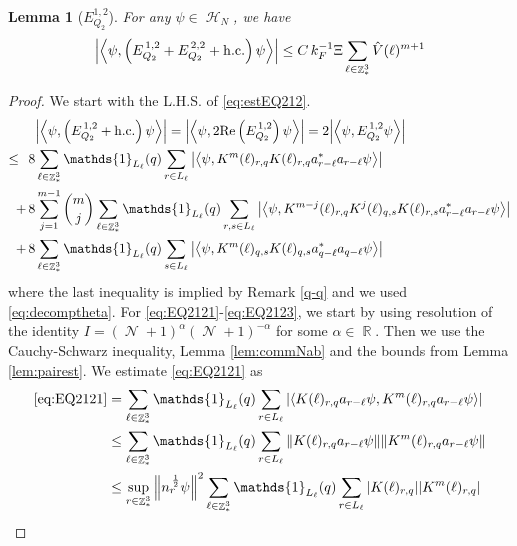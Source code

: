 \documentclass[sn-mathphys, Numbered ,a4paper]{sn-jnl}%
\DeclareMathOperator{\R}{\mathbb{R}}
\DeclareMathOperator{\Z}{\mathbb{Z}}
\DeclareMathOperator{\HH}{\mathcal{H}}
\DeclareMathOperator{\NN}{\mathcal{N}}
\newcommand{\half}{\frac{1}{2}}
\newcommand{\eva}[1]{\left\langle #1 \right\rangle}
\theoremstyle{plain}
\newtheorem{lemma}[theorem]{Lemma}
\theoremstyle{definition}
\theoremstyle{remark}
\theoremstyle{plain}
\theoremstyle{definition}
\theoremstyle{remark}
\begin{document}
\begin{lemma}[$E_{Q_2}^{1,2}$]\label{lem:EQ212}
    For any $\psi \in \HH_N$, we have
    \begin{alignat}{2}
    \abs{\eva{\psi,\left(E^{\,1,2}_{Q_2}+E^{\,2,2}_{Q_2}+\mathrm{h.c.}\right) \psi }}
   	\leq   C\, k_{F}^{-1} \Xi \sum\limits_{\ell \in \Z^3_*} \hat{V}(\ell)^{m+1} \label{eq:estEQ212}
    \end{alignat}
\end{lemma}
\begin{proof}
     We start with the L.H.S. of \eqref{eq:estEQ212}.
    \begin{align}
    	&\abs{\eva{\psi,\left(E^{\,1,2}_{Q_2}+\mathrm{h.c.}\right) \psi }} = \abs{\eva{\psi,2\mathrm{Re}\left(E^{\,1,2}_{Q_2}\right) \psi }} = 2\abs{\eva{\psi, E^{\,1,2}_{Q_2} \psi }}\nonumber\\
    	\leq\,\;8& \sum\limits_{\ell\in \Z^3_*} \mathds{1}_{L_{\ell}}(q) \sum\limits_{r\in L_{\ell}} \abs{\eva{\psi, K^m(\ell)_{r,q} K(\ell)_{r,q} a^*_{r-\ell} a_{r-\ell} \psi }}\label{eq:EQ2121}\\
    	+\,8& \sum\limits_{j=1}^{m-1} {{m}\choose j} \sum\limits_{\ell \in \Z^3_*}\mathds{1}_{L_{\ell}}(q) \sum\limits_{r,s\in L_{\ell}}  \abs{\eva{\psi, K^{m-j}(\ell)_{r,q} K^{j}(\ell)_{q,s} K(\ell)_{r,s} a^*_{r-\ell} a_{r-\ell} \psi }} \label{eq:EQ2122}\\
    	+\,8&\sum\limits_{\ell \in \Z^3_*} \mathds{1}_{L_{\ell}}(q) \sum\limits_{ s \in L_{\ell}} \abs{\eva{\psi, K^m(\ell)_{q,s} K(\ell)_{q,s} a^*_{q-\ell} a_{q-\ell} \psi }}\label{eq:EQ2123}
    \end{align}
    where the last inequality is implied by Remark \ref{q-q} and we used \eqref{eq:decomptheta}.
    For \eqref{eq:EQ2121}-\eqref{eq:EQ2123}, we start by using resolution of the identity $I = (\NN+1)^{\alpha}(\NN+1)^{-\alpha}$ for some $\alpha \in \R$. Then we use the Cauchy-Schwarz inequality, Lemma \ref{lem:commNab} and the bounds from Lemma \ref{lem:pairest}.
    We estimate \eqref{eq:EQ2121} as 
\begin{align}
    \eqref{eq:EQ2121}
    &= \sum\limits_{\ell \in \Z^3_*} \mathds{1}_{L_{\ell}}(q) \sum\limits_{r\in L_{\ell}} \abs{\eva{ K(\ell)_{r,q} a_{r-\ell} \psi, K^m(\ell)_{r,q}  a_{r-\ell} \psi }}\nonumber\\
    &\leq \sum\limits_{\ell \in \Z^3_*} \mathds{1}_{L_{\ell}}(q) \sum\limits_{r\in L_{\ell}} \norm{ K(\ell)_{r,q} a_{r-\ell} \psi}\norm{ K^m(\ell)_{r,q}  a_{r-\ell} \psi }\nonumber\\
	&\leq \sup\limits_{r\in \Z^3_*} \norm{n_r^{\,\half}\psi}^2 \sum\limits_{\ell \in \Z^3_*} \mathds{1}_{L_{\ell}}(q) \sum\limits_{r\in L_{\ell}} \abs{ K(\ell)_{r,q} } \abs{ K^m(\ell)_{r,q} }\nonumber\\

\end{align}
\end{proof}
\end{document}
